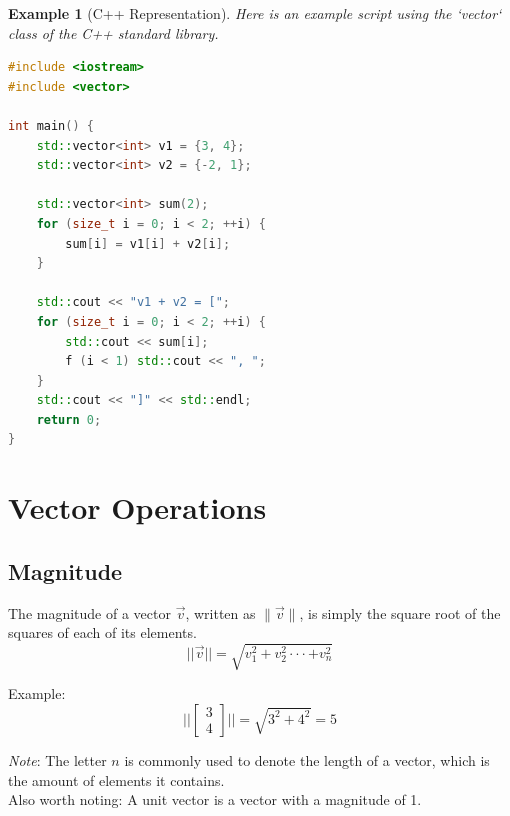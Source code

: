 \documentclass[12pt]{report}
\newtheorem{example}{Example}[section]
\begin{document}
            \begin{example}[C++ Representation] 
            Here is an example script using the `vector` class of the C++ standard library.
            \begin{lstlisting}[language=C++]
#include <iostream>
#include <vector>

int main() {
    std::vector<int> v1 = {3, 4};
    std::vector<int> v2 = {-2, 1};

    std::vector<int> sum(2);
    for (size_t i = 0; i < 2; ++i) {
        sum[i] = v1[i] + v2[i];
    }

    std::cout << "v1 + v2 = [";
    for (size_t i = 0; i < 2; ++i) {
        std::cout << sum[i];
        f (i < 1) std::cout << ", ";
    }
    std::cout << "]" << std::endl;
    return 0;
}
            \end{lstlisting}
            \end{example}
    \section{Vector Operations}
        \subsection{Magnitude}
            The magnitude of a vector $\vec{v}$, written as $\| \vec{v} \|$, is simply the square root of the squares of each of its elements.
            \begin{equation}
                ||\vec{v}|| = \sqrt{v^2_1 + v^2_2 \cdot\cdot\cdot + v^2_n}
            \end{equation}

            Example:
            \begin{equation}
                ||\begin{bmatrix} 3 \\ 4 \end{bmatrix}|| = \sqrt{3^2 + 4^2} = 5
            \end{equation}

            \emph{Note}: The letter $n$ is commonly used to denote the length of a vector, which is the amount of elements it contains. \\
            Also worth noting: A unit vector is a vector with a magnitude of 1.
    
\end{document}
